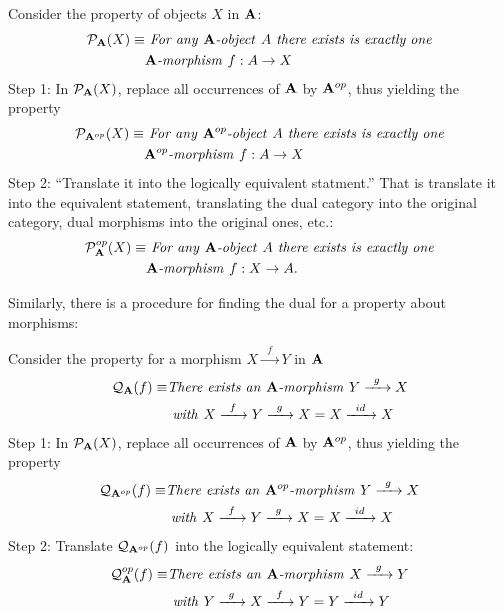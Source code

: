 \begin{ex}
Consider the property of objects $X$ in $\mathbf{A}$:
\begin{align*}
\mathcal{P}_{\mathbf{A}}(X) \equiv&\text{\emph{ For any }}\mathbf{A}\text{\emph{-object }}
A\text{\emph{ there exists is exactly one}}\\
 &\mathbf{A}\text{\emph{-morphism }}f:A\to X
\end{align*}
Step 1: In $\mathcal{P}_{\mathbf{A}}(X)$, replace all occurrences of
$\mathbf{A}$ by $\mathbf{A}^{op}$, thus yielding the property
\begin{align*}
\mathcal{P}_{\mathbf{A}^{op}}(X) \equiv&\text{\emph{ For any }}\mathbf{A}^{op}\text{\emph{-object }}
A\text{\emph{ there exists is exactly one}}\\
 &\mathbf{A}^{op}\text{\emph{-morphism }}f:A\to X
\end{align*}
Step 2: ``Translate it into the logically equivalent statment.''
That is translate it into the equivalent statement, translating
the dual category into the original category, dual morphisms into
the original ones, etc.:
\begin{align*}
\mathcal{P}^{op}_{\mathbf{A}}(X) \equiv&\text{\emph{ For any }}\mathbf{A}\text{\emph{-object }}
A\text{\emph{ there exists is exactly one}}\\
 &\mathbf{A}\text{\emph{-morphism }}f:X\to A.
\end{align*}
\end{ex}

Similarly, there is a procedure for finding the dual for a
property about morphisms:
\begin{ex}
Consider the property for a morphism $X\xrightarrow{\;\;f\;\;}Y$ in $\mathbf{A}$
\begin{align*}
\mathcal{Q}_{\mathbf{A}}(f) \equiv&\text{\emph{There exists an
}}\mathbf{A}\text{\emph{-morphism
}}Y\xrightarrow{\;\;g\;\;}X\\
&\text{\emph{ with }}X\xrightarrow{\;\;f\;\;}Y\xrightarrow{\;\;g\;\;}X=X\xrightarrow{\;\;id\;\;}X
\end{align*}
Step 1: In $\mathcal{P}_{\mathbf{A}}(X)$, replace all occurrences of
$\mathbf{A}$ by $\mathbf{A}^{op}$, thus yielding the property
\begin{align*}
\mathcal{Q}_{\mathbf{A}^{op}}(f) \equiv&\text{\emph{There exists an
}}\mathbf{A}^{op}\text{\emph{-morphism
}}Y\xrightarrow{\;\;g\;\;}X\\
&\text{\emph{ with }}X\xrightarrow{\;\;f\;\;}Y\xrightarrow{\;\;g\;\;}X=X\xrightarrow{\;\;id\;\;}X
\end{align*}
Step 2: Translate $\mathcal{Q}_{\mathbf{A}^{op}}(f)$ into the
logically equivalent statement:
\begin{align*}
\mathcal{ Q}_{\mathbf{A}}^{op}(f) \equiv&\text{\emph{There exists an
}}\mathbf{A}\text{\emph{-morphism
}}X\xrightarrow{\;\;g\;\;}Y\\
&\text{\emph{ with }}Y\xrightarrow{\;\;g\;\;}X\xrightarrow{\;\;f\;\;}Y=Y\xrightarrow{\;\;id\;\;}Y
\end{align*}
\end{ex}

